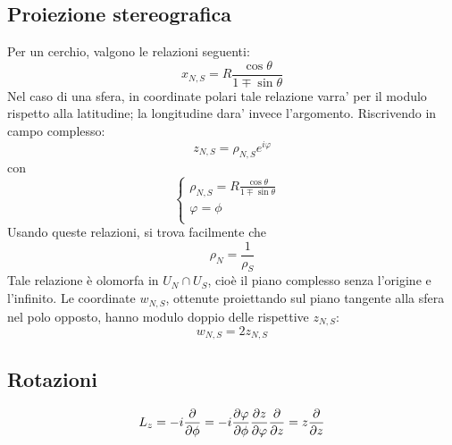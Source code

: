 \subsection{Proiezione stereografica}
Per un cerchio, valgono le relazioni seguenti:
\[ x_{N,S} = R \frac{\cos\theta}{1\mp\sin\theta} \]
Nel caso di una sfera, in coordinate polari tale relazione varra' per il modulo rispetto alla latitudine; la longitudine dara' invece l'argomento. Riscrivendo in campo complesso:
\[ z_{N,S} = \rho_{N,S} e^{i\varphi} \]
con 
\[ \begin{cases}
	\rho_{N,S} = R \frac{\cos\theta}{1\mp\sin\theta} & \\
	\varphi = \phi & \\
   \end{cases}
\]
Usando queste relazioni, si trova facilmente che 
\[ \rho_N = \frac{1}{\rho_S} \]
Tale relazione \`e olomorfa in \( U_N \cap U_S \), cio\`e il piano complesso senza l'origine e l'infinito.
Le coordinate $w_{N,S}$, ottenute proiettando sul piano tangente alla sfera nel polo opposto, hanno modulo doppio delle rispettive $z_{N,S}$:
\[ w_{N,S} = 2z_{N,S} \]

\subsection{Rotazioni}
\[ L_z = -i\frac{\partial }{\partial \phi} = -i \frac{\partial \varphi}{\partial \phi}\frac{\partial z}{\partial \varphi}\frac{\partial }{\partial z} = z\frac{\partial }{\partial z} \]
